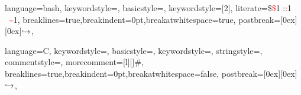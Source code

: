 {language=bash,
  keywordstyle=\color{Blue},
  basicstyle=\ttfamily\small,
  keywordstyle=[2]{\color{Red}},
  literate={\$}{{\textcolor{Red}{\$}}}1 
         {:}{{\textcolor{Red}{:}}}1
         {~}{{\textcolor{Red}{\textasciitilde}}}1,
  breaklines=true,breakindent=0pt,breakatwhitespace=true,
  postbreak=\raisebox{0ex}[0ex][0ex]{\ensuremath{\color{black}\hookrightarrow\space}},
}

{language=C,
  keywordstyle=\color{Blue},
  basicstyle=\ttfamily\small,
  keywordstyle=\color{Blue},
  stringstyle=\color{Red},
                commentstyle=\color{Green},
                morecomment=[l][\color{Magenta}]{\#},
  breaklines=true,breakindent=0pt,breakatwhitespace=false,
  postbreak=\raisebox{0ex}[0ex][0ex]{\ensuremath{\color{black}\hookrightarrow\space}},
}